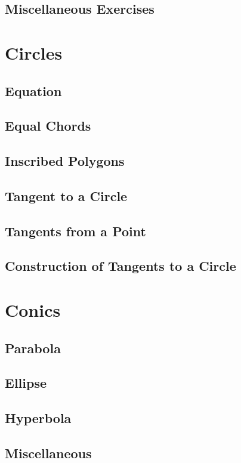 \documentclass[11pt]{book}
\begin{document}
\section{Miscellaneous Exercises}



\chapter{Circles}
\section{Equation}
\section{Equal Chords}
\section{Inscribed Polygons }
\section{Tangent to a Circle}
\section{Tangents from a Point}
\section{Construction of Tangents to a Circle}

\chapter{Conics}
\section{Parabola}
\section{Ellipse}
\section{Hyperbola}
\section{Miscellaneous}
\end{document}
